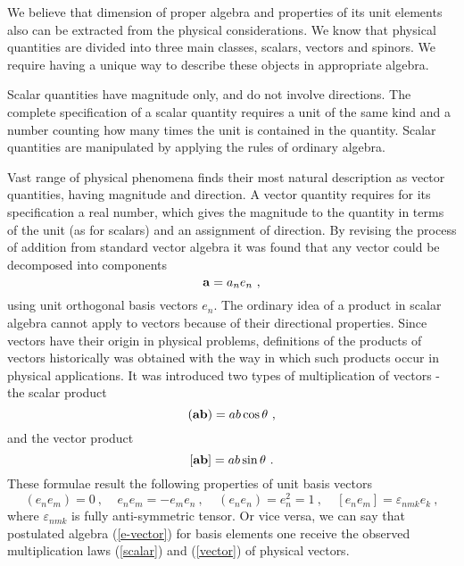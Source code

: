 \documentclass[a4paper,12pt]{article}
\begin{document}
We believe that dimension of proper algebra and properties of its unit elements also can 
be extracted from the physical considerations. We know that physical quantities are divided 
into three main classes, scalars, vectors and spinors. We require having a unique way to 
describe these objects in appropriate algebra.

Scalar quantities have magnitude only, and do not involve directions. The complete 
specification of a scalar quantity requires a unit of the same kind and a number counting 
how many times the unit is contained in the quantity. Scalar quantities are manipulated by 
applying the rules of ordinary algebra. 

Vast range of physical phenomena finds their most natural description as vector quantities, 
having magnitude and direction. A vector quantity requires for its specification a real 
number, which gives the magnitude to the quantity in terms of the unit (as for scalars) 
and an assignment of direction. By revising the process of addition from standard vector 
algebra it was found that any vector could be decomposed into components 
\begin{equation} \label{a}
{\bf a} = a_ne_n ~,
\end{equation}
using unit orthogonal basis vectors $e_n$. The ordinary idea of a product in scalar algebra 
cannot apply to vectors because of their directional properties. Since vectors have their 
origin in physical problems, definitions of the products of vectors historically was 
obtained with the way in which such products occur in physical applications. It was 
introduced two types of multiplication of vectors - the scalar product 
\begin{equation} \label{scalar}
({\bf ab}) = ab\cos{\theta} ~,
\end{equation}
and the vector product 
\begin{equation} \label{vector}
 [{\bf ab}] = ab\sin{\theta} ~.
\end{equation}
These formulae result the following properties of unit basis vectors
\begin{equation} \label{e-vector}
(e_ne_m) = 0 ~, ~~~~~ e_ne_m = - e_me_n ~, ~~~~~(e_ne_n) = e_n^2 = 1 ~, 
~~~~~[e_ne_m] = \varepsilon_{nmk}e_k ~,
\end{equation}
where $\varepsilon_{nmk}$ is fully anti-symmetric tensor. Or vice versa, we can say that 
postulated algebra (\ref{e-vector}) for basis elements one receive the observed 
multiplication laws (\ref{scalar}) and (\ref{vector}) of physical vectors. 
\end{document}

